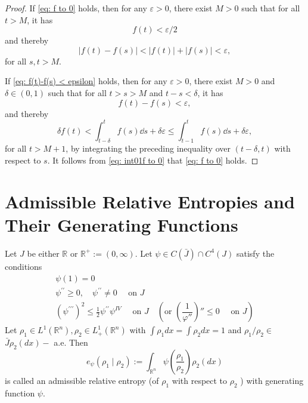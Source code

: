 \begin{proof}
	If \eqref{eq: f to 0} holds, then for any $\varepsilon > 0$, 
	there exist $M>0$ such that 
	for all $t>M$,  
	it has 
	\begin{equation*}
		f(t) < \varepsilon/2
	\end{equation*}
	and thereby 
	\begin{equation*}
		|f(t) - f(s)| < |f(t)| + |f(s)| < \varepsilon,
	\end{equation*}
	for all $s,t>M$.

	If \eqref{eq: f(t)-f(s) < epsilon} holds, then for any $\varepsilon > 0$, 
	there exist $M>0$ and $\delta \in (0,1)$ such that 
	for all $t>s>M$ and $t-s<\delta$, 
	it has 
	\begin{equation*}
		f(t) - f(s) < \varepsilon,
	\end{equation*}
	and thereby 
	\begin{equation*}
		\delta f(t) 
		< \int_{t-\delta}^t f(s)\dd s + \delta\varepsilon
		\leq\int_{t-1}^t f(s)\dd s + \delta\varepsilon,
	\end{equation*}
	for all $t>M+1$,
	by integrating the preceding inequality over $(t-\delta, t)$ with respect to $s$.
	It follows from \eqref{eq: int01f to 0} that \eqref{eq: f to 0} holds.
\end{proof}

\section{Admissible Relative Entropies and Their Generating
	Functions}

\begin{definition}
	 Let $J$ be either $\mathbb{R}$ or $\mathbb{R}^{+}:=(0, \infty) .$ Let $\psi \in C(\bar{J}) \cap C^{4}(J)$ satisfy the conditions
	$$
	\begin{array}{l}
	\psi(1)=0 \\
	\psi^{\prime \prime} \geq 0, \quad \psi^{\prime \prime} \neq 0 \quad \text { on } J \\
	\left(\psi^{\prime \prime \prime}\right)^{2} \leq \frac{1}{2} \psi^{\prime \prime} \psi^{I V} \quad \text { on } J \quad (\text{or } (\dfrac1{\varphi''})''\leqslant0 \quad \text { on } J)
	\end{array}
	$$
	Let $\rho_{1} \in L^{1}\left(\mathbb{R}^{n}\right), \rho_{2} \in L_{+}^{1}\left(\mathbb{R}^{n}\right)$ with $\int \rho_{1} d x=\int \rho_{2} d x=1$ and $\rho_{1} / \rho_{2} \in$
	$\bar{J} \rho_{2}(d x)-$ a.e. Then
	$$
	e_{\psi}\left(\rho_{1} \mid \rho_{2}\right):=\int_{\mathbb{R}^{n}} \psi\left(\frac{\rho_{1}}{\rho_{2}}\right) \rho_{2}(d x)
	$$
	is called an admissible relative entropy (of $\rho_{1}$ with respect to $\rho_{2}$ ) with generating function $\psi$.
\end{definition}

